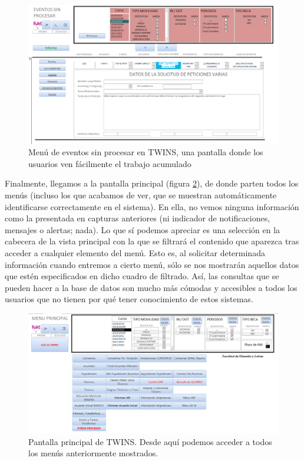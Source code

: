 \begin{itemize}
	\begin{figure}
		\includegraphics[width=\textwidth]{img/Capturas de TWINS/eventosSinProcesar.png}
		\caption[Eventos sin procesar de TWINS]{Menú de eventos sin procesar en TWINS, una pantalla donde los usuarios ven fácilmente el trabajo acumulado}
		\label{fig:eventosSinProcesar}
	\end{figure}
	
	
\end{itemize}

Finalmente, llegamos a la pantalla principal (figura \ref{fig:pantallaPrincipal}), de donde parten todos los menús (incluso los que acabamos de ver, que se muestran automáticamente identificarse correctamente en el sistema). En ella, no vemos ninguna información como la presentada en capturas anteriores (ni indicador de notificaciones, mensajes o alertas; nada). Lo que sí podemos apreciar es una selección en la cabecera de la vista principal con la que se filtrará el contenido que aparezca tras acceder a cualquier elemento del menú. Esto es, al solicitar determinada información cuando entremos a cierto menú, sólo se nos mostrarán aquellos datos que estén especificados en dicho cuadro de filtrado. Así, las consultas que se pueden hacer a la base de datos son mucho más cómodas y accesibles a todos los usuarios que no tienen por qué tener conocimiento de estos sistemas.

\begin{figure}
	\includegraphics[width=\textwidth]{img/Capturas de TWINS/pantallaPrincipal.png}
	\caption[Menú principal de TWINS]{Pantalla principal de TWINS. Desde aquí podemos acceder a todos los menús anteriormente mostrados.}
	\label{fig:pantallaPrincipal}
\end{figure}

